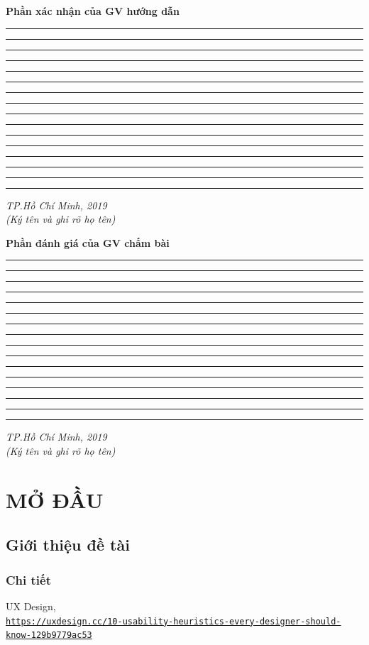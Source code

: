 \documentclass[oneside, 12pt]{report}   	%
\begin{document}
\textbf{Phần xác nhận của GV hướng dẫn}

\footnotesize
\begin{center}
	\noindent\rule{17cm}{0.4pt}
	\noindent\rule{17cm}{0.4pt}
	\noindent\rule{17cm}{0.4pt}
	\noindent\rule{17cm}{0.4pt}
	\noindent\rule{17cm}{0.4pt}
	\noindent\rule{17cm}{0.4pt}
	\noindent\rule{17cm}{0.4pt}
	\noindent\rule{17cm}{0.4pt}
	\noindent\rule{17cm}{0.4pt}
	\noindent\rule{17cm}{0.4pt}
	\noindent\rule{17cm}{0.4pt}
	\noindent\rule{17cm}{0.4pt}
	\noindent\rule{17cm}{0.4pt}
	\noindent\rule{17cm}{0.4pt}
	\noindent\rule{17cm}{0.4pt}
	\noindent\rule{17cm}{0.4pt}
\end{center}


\begin{flushright}
	\textit{TP.Hồ Chí Minh, \hspace*{50pt} 2019}\\
	\textit{(Ký tên và ghi rõ họ tên)}
\end{flushright}

\newpage
\textbf{Phần đánh giá của GV chấm bài}

\footnotesize
\begin{center}
	\noindent\rule{17cm}{0.4pt}
	\noindent\rule{17cm}{0.4pt}
	\noindent\rule{17cm}{0.4pt}
	\noindent\rule{17cm}{0.4pt}
	\noindent\rule{17cm}{0.4pt}
	\noindent\rule{17cm}{0.4pt}
	\noindent\rule{17cm}{0.4pt}
	\noindent\rule{17cm}{0.4pt}
	\noindent\rule{17cm}{0.4pt}
	\noindent\rule{17cm}{0.4pt}
	\noindent\rule{17cm}{0.4pt}
	\noindent\rule{17cm}{0.4pt}
	\noindent\rule{17cm}{0.4pt}
	\noindent\rule{17cm}{0.4pt}
	\noindent\rule{17cm}{0.4pt}
	\noindent\rule{17cm}{0.4pt}
\end{center}

\begin{flushright}
	\textit{TP.Hồ Chí Minh, \hspace*{50pt} 2019}\\
	\textit{(Ký tên và ghi rõ họ tên)}
\end{flushright}

\graphicspath{ {./images/Pictures/} }

\setcounter{secnumdepth}{2}
\tableofcontents

\listoffigures

\listoftables


\chapter{ MỞ ĐẦU }

\section{ Giới thiệu đề tài }

\subsection{Chi tiết}



\begin{thebibliography}{}
		UX Design,
		\\\texttt{\url{https://uxdesign.cc/10-usability-heuristics-every-designer-should-know-129b9779ac53}}

\end{thebibliography}
\end{document}
